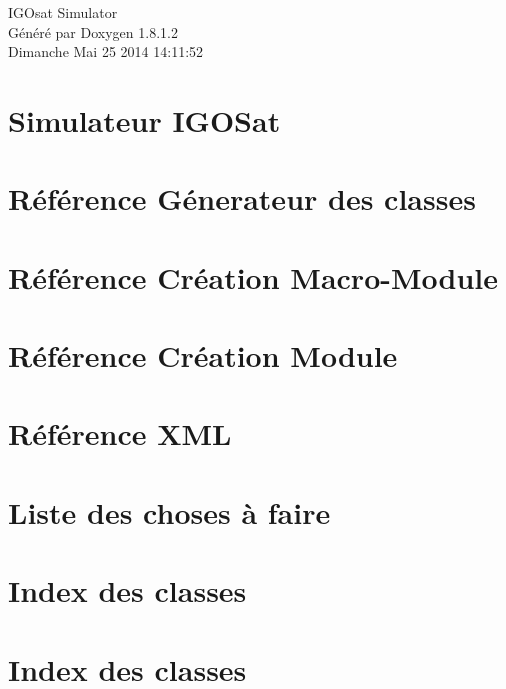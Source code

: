 \documentclass{book}
\begin{document}
\hypersetup{pageanchor=false,citecolor=blue}
\begin{titlepage}
\vspace*{7cm}
\begin{center}
{\Large I\-G\-Osat Simulator }\\
\vspace*{1cm}
{\large Généré par Doxygen 1.8.1.2}\\
\vspace*{0.5cm}
{\small Dimanche Mai 25 2014 14:11:52}\\
\end{center}
\end{titlepage}
\clearemptydoublepage
{}
\tableofcontents
\clearemptydoublepage
{}
\hypersetup{pageanchor=true,citecolor=blue}
\chapter{Simulateur I\-G\-O\-Sat}
\label{index}\hypertarget{index}{}
\chapter{Référence Génerateur des classes}
\label{docGenereateur}
\hypertarget{docGenereateur}{}

\chapter{Référence Création Macro-\/\-Module}
\label{docMacroModule}
\hypertarget{docMacroModule}{}

\chapter{Référence Création Module}
\label{docModule}
\hypertarget{docModule}{}

\chapter{Référence X\-M\-L}
\label{xmlRef}
\hypertarget{xmlRef}{}

\chapter{Liste des choses à faire}
\label{todo}
\hypertarget{todo}{}

\chapter{Index des classes}

\chapter{Index des classes}

\end{document}
